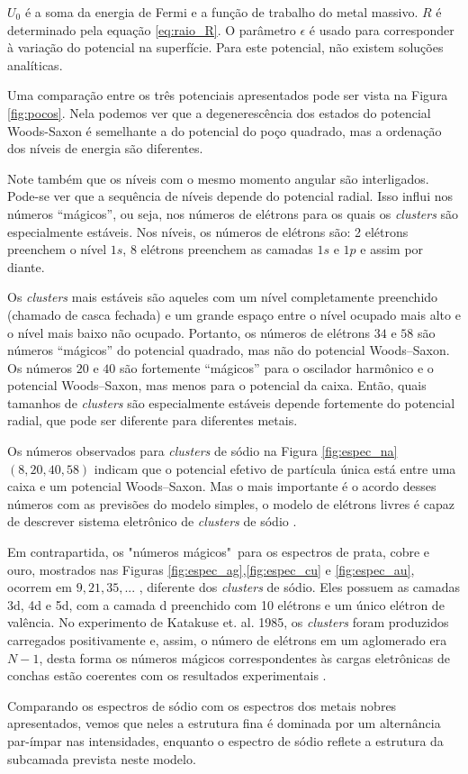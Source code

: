 $U_0$ é a soma da energia de Fermi e a função de trabalho do metal massivo. $R$ é determinado pela equação \ref{eq:raio_R}. O parâmetro $\epsilon$ é usado para corresponder à variação do potencial na superfície. Para este potencial, não existem soluções analíticas.


Uma comparação entre os três potenciais apresentados pode ser vista na Figura \ref{fig:pocos}. Nela podemos ver que a degenerescência dos estados do potencial Woods-Saxon é semelhante a do potencial do poço quadrado, mas a ordenação dos níveis de energia são diferentes.

 Note também que os níveis com o mesmo momento angular são interligados. Pode-se ver que a sequência de níveis depende do potencial radial. Isso influi nos números “mágicos”, ou seja, nos números de elétrons para os quais os \textit{clusters} são especialmente estáveis. Nos níveis, os números de elétrons são: 2 elétrons preenchem o nível $1s$, 8 elétrons preenchem as camadas $1s$ e $1p$ e assim por diante.
 
 Os \textit{clusters} mais estáveis são aqueles com um nível completamente preenchido (chamado de casca fechada) e um grande espaço entre o nível ocupado mais alto e o nível mais baixo não ocupado. Portanto, os números de elétrons $34$ e $58$ são números “mágicos” do potencial quadrado, mas não do potencial Woods–Saxon. Os números $20$ e $40$ são fortemente “mágicos” para o oscilador harmônico e o potencial Woods–Saxon, mas menos para o potencial da caixa. Então, quais tamanhos de \textit{clusters} são especialmente estáveis depende fortemente do potencial radial, que pode ser diferente para diferentes metais.
 
Os números observados para 
\textit{clusters} de sódio na Figura \ref{fig:espec_na} $(8, 20, 40, 58)$ indicam que o potencial efetivo de partícula única está entre uma caixa e um potencial Woods–Saxon. Mas o mais importante é o acordo desses números com as previsões do modelo simples, o modelo de elétrons livres é capaz de descrever sistema eletrônico de \textit{clusters} de sódio \cite{livro_Clusters_Fullerenes}.



Em contrapartida, os "números mágicos"\ para os espectros de prata, cobre e ouro, mostrados nas Figuras \ref{fig:espec_ag},\ref{fig:espec_cu} e \ref{fig:espec_au}, ocorrem em
$9, 21, 35,...$ , diferente dos \textit{clusters} de sódio. Eles possuem as camadas 3d, 4d e 5d, com a camada d preenchido com 10 elétrons e um único elétron de valência. No experimento de Katakuse et. al. 1985,  os \textit{clusters} foram produzidos carregados positivamente e, assim, o número de elétrons em um aglomerado era $N - 1$, desta forma os números mágicos correspondentes às cargas eletrônicas de conchas estão coerentes com os resultados experimentais \cite{Heer}.

Comparando os espectros de sódio com os espectros dos metais nobres apresentados, vemos que neles a estrutura fina é dominada por um alternância par-ímpar nas intensidades, enquanto o espectro de sódio reflete a estrutura da subcamada prevista neste modelo. 




